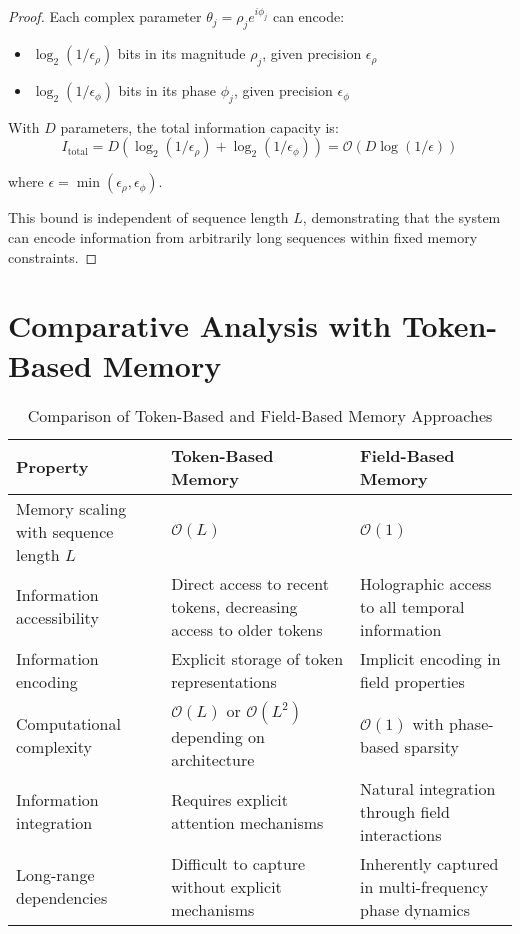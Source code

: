 \begin{proof}
Each complex parameter $\theta_j = \rho_j e^{i\phi_j}$ can encode:
\begin{itemize}
    \item $\log_2(1/\epsilon_\rho)$ bits in its magnitude $\rho_j$, given precision $\epsilon_\rho$
    \item $\log_2(1/\epsilon_\phi)$ bits in its phase $\phi_j$, given precision $\epsilon_\phi$
\end{itemize}

With $D$ parameters, the total information capacity is:
\begin{equation}
I_{\text{total}} = D(\log_2(1/\epsilon_\rho) + \log_2(1/\epsilon_\phi)) = \mathcal{O}(D \log(1/\epsilon))
\end{equation}

where $\epsilon = \min(\epsilon_\rho, \epsilon_\phi)$.

This bound is independent of sequence length $L$, demonstrating that the system can encode information from arbitrarily long sequences within fixed memory constraints.
\end{proof}

\section{Comparative Analysis with Token-Based Memory}

\begin{table}[h]
\centering
\begin{tabular}{|p{4cm}|p{5cm}|p{5cm}|}
\hline
\textbf{Property} & \textbf{Token-Based Memory} & \textbf{Field-Based Memory} \\
\hline
Memory scaling with sequence length $L$ & $\mathcal{O}(L)$ & $\mathcal{O}(1)$ \\
\hline
Information accessibility & Direct access to recent tokens, decreasing access to older tokens & Holographic access to all temporal information \\
\hline
Information encoding & Explicit storage of token representations & Implicit encoding in field properties \\
\hline
Computational complexity & $\mathcal{O}(L)$ or $\mathcal{O}(L^2)$ depending on architecture & $\mathcal{O}(1)$ with phase-based sparsity \\
\hline
Information integration & Requires explicit attention mechanisms & Natural integration through field interactions \\
\hline
Long-range dependencies & Difficult to capture without explicit mechanisms & Inherently captured in multi-frequency phase dynamics \\
\hline
\end{tabular}
\caption{Comparison of Token-Based and Field-Based Memory Approaches}
\end{table}

